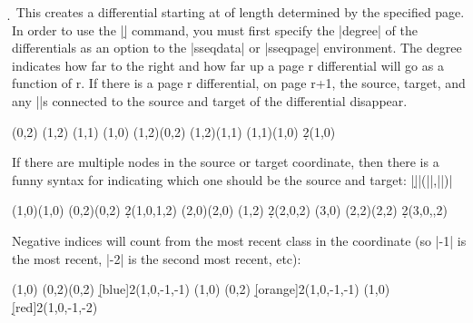 \documentclass{ltxdoc}
\begin{document}
\begin{sseqdata}[name=ex1,degree={#1}{1-#1}]
\begin{command}{\d{}}
This creates a differential starting at  of length determined by the specified page. In order to use the |\d| command, you must first specify the |degree| of the differentials as an option to the |sseqdata| or |sseqpage| environment. The degree indicates how far to the right and how far up a page r differential will go as a function of r. If there is a page r differential, on page r+1, the source, target, and any |\structline|s connected to the source and target of the differential disappear.
\begin{codeexample}[width=7.5cm]
\begin{sseqdata}[name=d example,degree={-1}{#1},
                 struct lines=blue]
\class(0,2)
\class(1,2)
\class(1,1)
\class(1,0)
\structline(1,2)(0,2)
\structline(1,2)(1,1)
\structline(1,1)(1,0)
\d2(1,0)
\end{sseqdata}
\printpage[name=d example,page=2]
\hskip0.3cm
\printpage[name=d example,page=3]
\end{codeexample}
If there are multiple nodes in the source or target coordinate, then there is a funny syntax for indicating which one should be the source and target:
|\d||(||,||)|
\begin{codeexample}[width=6cm]
\begin{sseqpage}
\class(1,0)\class(1,0)
\class(0,2)\class(0,2)
\d2(1,0,1,2)
\class(2,0)\class(2,0)
\class(1,2)
\d2(2,0,2)
\class(3,0)
\class(2,2)\class(2,2)
\d2(3,0,,2)
\end{sseqpage}
\end{codeexample}
Negative indices will count from the most recent class in the coordinate (so |-1| is the most recent, |-2| is the second most recent, etc):
\begin{codeexample}[]
\begin{sseqpage}
\class(1,0)
\class(0,2)\class(0,2)
\d[blue]2(1,0,-1,-1)
\class(1,0)
\class(0,2)
\d[orange]2(1,0,-1,-1)
\class(1,0)
\d[red]2(1,0,-1,-2)
\end{sseqpage}
\end{codeexample}
\end{command}

\begin{command}{}

\end{command}


\end{sseqdata}
\end{document}
